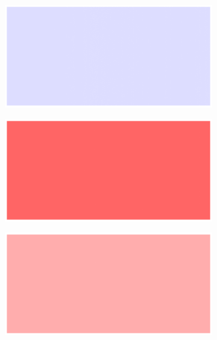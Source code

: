 \begin{figure}[!h]
    \begin{subfigure}{0.33\textwidth}
        \includegraphics[width=\textwidth]{figures/anomalies/ae/20190415_031735.png}
    \end{subfigure}%
    \hfill
    \begin{subfigure}{0.33\textwidth}
        \includegraphics[width=\textwidth]{figures/anomalies/ae/20190415_031750.png}
    \end{subfigure}%
    \hfill
    \begin{subfigure}{0.33\textwidth}
        \includegraphics[width=\textwidth]{figures/anomalies/ae/20190415_031755.png}
    \end{subfigure}
    

\end{figure}
